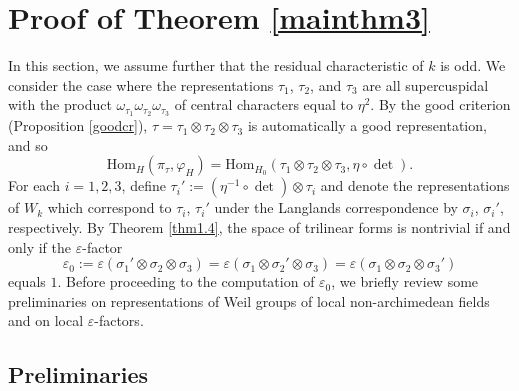 \documentclass[12pt]{amsart}
\newcommand{\Hom}{{\mathrm{Hom}}}
\theoremstyle{Theorem}
\theoremstyle{Theorem}
\theoremstyle{Theorem}
\theoremstyle{Theorem}
\theoremstyle{Plain}
\theoremstyle{remark}
\theoremstyle{remark}
\theoremstyle{Definition}
\begin{document}
\section{Proof of Theorem \ref{mainthm3}}

In this section, we assume further that the residual characteristic of $k$ is odd. We consider the case where the representations $\tau_1$, $\tau_2$, and $\tau_3$ are all supercuspidal with the product $ \omega_{ \tau_1 } \omega_{ \tau_2 } \omega_{ \tau_3 } $ of central characters equal to $\eta^2$. By the good criterion (Proposition \ref{goodcr}), $ \tau = \tau_1 \otimes \tau_2 \otimes \tau_3 $ is automatically a good representation, and so 
\[
    \Hom_{H} ( \pi_\tau, \varphi_H ) = \Hom_{ H_0 } ( \tau_1 \otimes \tau_2 \otimes \tau_3, \eta \circ \det ).
\]
For each $ i = 1, 2, 3 $, define $ \tau_i' := \left( \eta^{-1} \circ \det \right) \otimes \tau_i $ and denote the representations of $W_k$ which correspond to $\tau_i$, $\tau_i'$ under the Langlands correspondence by $\sigma_i$, $\sigma_i'$, respectively. By Theorem \ref{thm1.4}, the space of trilinear forms is nontrivial if and only if the $\varepsilon$-factor
\[
    \varepsilon_0 := \varepsilon \left( \sigma_1' \otimes \sigma_2 \otimes \sigma_3 \right) = \varepsilon \left( \sigma_1 \otimes \sigma_2' \otimes \sigma_3 \right) = \varepsilon \left( \sigma_1 \otimes \sigma_2 \otimes \sigma_3' \right)
\]
equals $1$. Before proceeding to the computation of $ \varepsilon_0 $, we briefly review some preliminaries on representations of Weil groups of local non-archimedean fields and on local $\varepsilon$-factors.

\subsection{Preliminaries}
\end{document}
